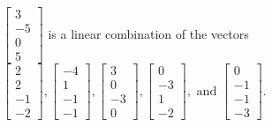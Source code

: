 \begin{exercise}
\begin{exerciseStatement}
  \end{exerciseStatement}
  \begin{exerciseAnswer}
   \(\left[\begin{array}{c}
3 \\
-5 \\
0 \\
5
\end{array}\right]\) 
  	 is  
	a linear combination of the vectors \(\left[\begin{array}{c}
2 \\
2 \\
-1 \\
-2
\end{array}\right] , \left[\begin{array}{c}
-4 \\
1 \\
-1 \\
-1
\end{array}\right] , \left[\begin{array}{c}
3 \\
0 \\
-3 \\
0
\end{array}\right] , \left[\begin{array}{c}
0 \\
-3 \\
1 \\
-2
\end{array}\right] , \text{ and } \left[\begin{array}{c}
0 \\
-1 \\
-1 \\
-3
\end{array}\right]\).

	
  


  \end{exerciseAnswer}
\end{exercise}